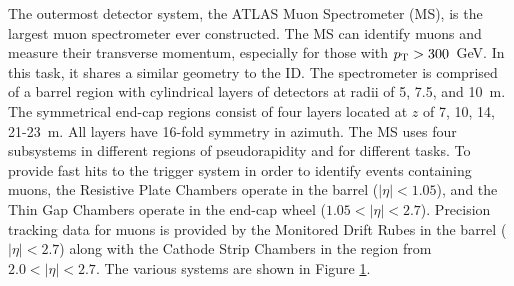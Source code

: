 \begin{figure}[h!]
\captionsetup[subfigure]{position=b}
\centering
{}
\caption{}
\label{fig:atlasMs}
\end{figure}

The outermost detector system, the ATLAS Muon Spectrometer (MS), is the largest muon spectrometer ever constructed. \check
The MS can identify muons and measure their transverse momentum, especially for those with $p_\text{T}>300$~GeV.
In this task, it shares a similar geometry to the ID.
The spectrometer is comprised of a barrel region with cylindrical layers of detectors at radii of 5, 7.5, and 10~m.
The symmetrical end-cap regions consist of four layers located at $z$ of 7, 10, 14, 21-23~m.
All layers have 16-fold symmetry in azimuth.
The MS uses four subsystems in different regions of pseudorapidity and for different tasks.
To provide fast hits to the trigger system in order to identify events containing muons, the Resistive Plate Chambers operate in the barrel ($|\eta|<1.05$), and the Thin Gap Chambers operate in the end-cap wheel ($1.05<|\eta|<2.7$).
Precision tracking data for muons is provided by the Monitored Drift Rubes in the barrel ($|\eta|<2.7$) along with the Cathode Strip Chambers in the region from $2.0<|\eta|<2.7$.
The various systems are shown in Figure \ref{fig:atlasMs}.
\cite{muonTdr}

